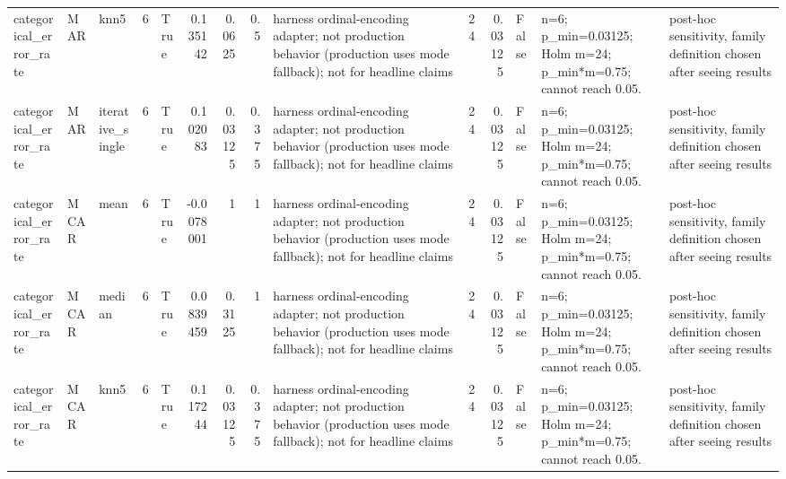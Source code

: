 \begin{table}[ht]
\begin{tabular}{lllrlrrrlrrlll}
 categorical\_error\_rate & MAR         & knn5             &            6 & True                &       0.135142   & 0.0625     & 0.5       & harness ordinal-encoding adapter; not production behavior (production uses mode fallback); not for headline claims &                             24 &                         0.03125    & False                       & n=6; p\_min=0.03125; Holm m=24; p\_min*m=0.75; cannot reach 0.05.  & post-hoc sensitivity, family definition chosen after seeing results \\
 categorical\_error\_rate & MAR         & iterative\_single &            6 & True                &       0.102083   & 0.03125    & 0.375     & harness ordinal-encoding adapter; not production behavior (production uses mode fallback); not for headline claims &                             24 &                         0.03125    & False                       & n=6; p\_min=0.03125; Holm m=24; p\_min*m=0.75; cannot reach 0.05.  & post-hoc sensitivity, family definition chosen after seeing results \\
 categorical\_error\_rate & MCAR        & mean             &            6 & True                &      -0.0078001  & 1          & 1         & harness ordinal-encoding adapter; not production behavior (production uses mode fallback); not for headline claims &                             24 &                         0.03125    & False                       & n=6; p\_min=0.03125; Holm m=24; p\_min*m=0.75; cannot reach 0.05.  & post-hoc sensitivity, family definition chosen after seeing results \\
 categorical\_error\_rate & MCAR        & median           &            6 & True                &       0.0839459  & 0.3125     & 1         & harness ordinal-encoding adapter; not production behavior (production uses mode fallback); not for headline claims &                             24 &                         0.03125    & False                       & n=6; p\_min=0.03125; Holm m=24; p\_min*m=0.75; cannot reach 0.05.  & post-hoc sensitivity, family definition chosen after seeing results \\
 categorical\_error\_rate & MCAR        & knn5             &            6 & True                &       0.117244   & 0.03125    & 0.375     & harness ordinal-encoding adapter; not production behavior (production uses mode fallback); not for headline claims &                             24 &                         0.03125    & False                       & n=6; p\_min=0.03125; Holm m=24; p\_min*m=0.75; cannot reach 0.05.  & post-hoc sensitivity, family definition chosen after seeing results \\

\end{tabular}
\end{table}

